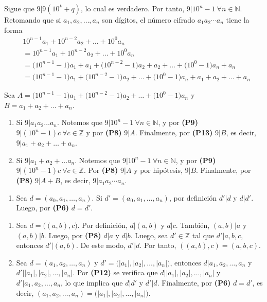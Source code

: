 \documentclass[11pt]{article}
\newcommand{\N}{\mathbb{N}}
\newcommand{\Z}{\mathbb{Z}}
\begin{document}
\begin{enumerate}[start=10]
\begin{enumerate}[label=\roman*)]
        Sigue que $9|9(10^k+q)$, lo cual es verdadero. Por tanto, $9|10^n-1 \ \forall n\in \N$.\\
        Retomando que si $a_1,a_2,\dots, a_n$ son dígitos, el número cifrado $a_1a_2 \cdots a_n$ tiene la forma
        \begin{align*}
          &10^{n-1}a_1+10^{n-2}a_2+\dots+10^{0}a_n \\ &= 10^{n-1}a_1+10^{n-2}a_2+\dots+10^{0}a_n\\
        &= \big(10^{n-1}-1 \big)a_1+a_1+\big(10^{n-2}-1 \big)a_2+a_2+ \dots + \big(10^0-1 \big)a_n+a_n \\
        &= \big(10^{n-1}-1 \big)a_1+\big(10^{n-2}-1 \big)a_2+ \dots + \big(10^0-1 \big)a_n+ a_1+a_2 +\dots + a_n \end{align*}
        
        \pagebreak

        Sea $A=\big(10^{n-1}-1 \big)a_1+\big(10^{n-2}-1 \big)a_2+ \dots + \big(10^0-1 \big)a_n$ y $B=a_1+a_2 +\dots + a_n$.
        
        \begin{enumerate}[label=\roman*)]
            \item Si $9|a_1a_2\dots a_n$. Notemos que $9|10^n-1 \ \forall n\in\N$, y por \textbf{(P9)} $9|(10^n-1)c \ \forall c\in\Z$ y por \textbf{(P8)} $9|A$. Finalmente, por \textbf{(P13)} $9|B$, es decir, $9|a_1+a_2 +\dots + a_n$.
            \item Si $9|a_1+a_2+\dots a_n$. Notemos que $9|10^n-1 \ \forall n\in\N$, y por \textbf{(P9)} $9|(10^n-1)c \ \forall c\in\Z$. Por \textbf{(P8)} $9|A$ y por hipótesis, $9|B$. Finalmente, por \textbf{(P8)} $9|A+B$, es decir, $9|a_1a_2 \cdots a_n$.
          \end{enumerate}
    \end{enumerate}
\end{enumerate}

    \begin{enumerate}[label=30.1]
      \item Sea $d=(a_0,a_1,\dots,a_n)$. Si $d'=(a_0,a_1,\dots,a_n)$, por definición $d'|d$ y $d|d'$. Luego, por \textbf{(P6)} $d=d'$.
    \end{enumerate}

\begin{enumerate}[start=31]
  \item Sea $d=\big((a,b),c \big)$. Por definición, $d|(a,b)$ y $d|c$. También, $(a,b)|a$ y $(a,b)|b$. Luego, por \textbf{(P8)} $d|a$ y $d|b$. Luego, sea $d'\in\Z$ tal que $d'|a,b,c$, entonces $d'|(a,b)$. De este modo, $d'|d$. Por tanto, $((a,b),c)=(a,b,c)$.
  \item Sea $d=(a_1,a_2,\dots,a_n)$ y $d'=\big(|a_1|,|a_2|,\dots,|a_n| \big)$, entonces $d \big| a_1,a_2,\dots,a_n$ y $d' \Big||a_1|,|a_2|,\dots,|a_n|$. Por \textbf{(P12)} se verifica que $d \Big| |a_1|,|a_2|,\dots,|a_n|$ y $d' \big| a_1,a_2,\dots,a_n$, lo que implica que $d|d'$ y $d'|d$. Finalmente, por \textbf{(P6)} $d=d'$, es decir, $(a_1,a_2,\dots,a_n)=\big(|a_1|,|a_2|,\dots,|a_n| \big)$.
\end{enumerate}
\end{document}

